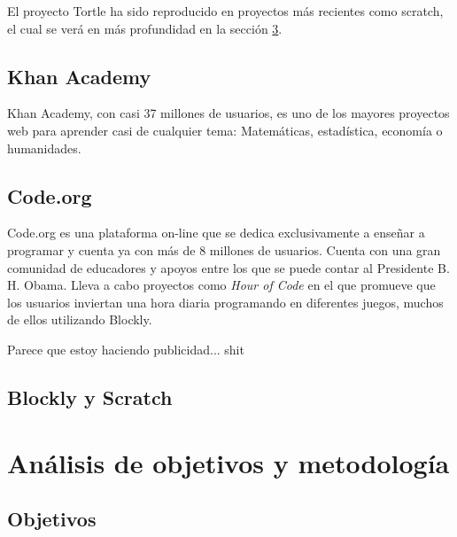 El proyecto Tortle ha sido reproducido en proyectos más recientes como \Gls{scratch}\cite{scratch}, el cual se verá en más profundidad en la sección \ref{sec:blockly-scratch}.



\section{Khan Academy}
\label{sec:Khan Academy}

Khan Academy\cite{khan-academy}, con casi 37 millones de usuarios, es uno de los mayores proyectos web para aprender casi de cualquier tema: Matemáticas, estadística, economía o humanidades.


\section{Code.org}
\label{sec:Code.org}

Code.org\cite{code-org} es una plataforma on-line que se dedica exclusivamente a enseñar a programar y cuenta ya con más de 8 millones de usuarios. Cuenta con una gran comunidad de educadores y apoyos entre los que se puede contar al Presidente B. H. Obama. Lleva a cabo proyectos como \emph{Hour of Code} en el que promueve que los usuarios inviertan una hora diaria programando en diferentes juegos, muchos de ellos utilizando \Gls{Blockly}\cite{blockly}.

{\color{red} Parece que estoy haciendo publicidad... shit}

\section{Blockly y Scratch}
\label{sec:blockly-scratch}


\chapter{Análisis de objetivos y metodología}\label{objetivos-metodologia}

\section{Objetivos}
\label{sec:Objetivos}

